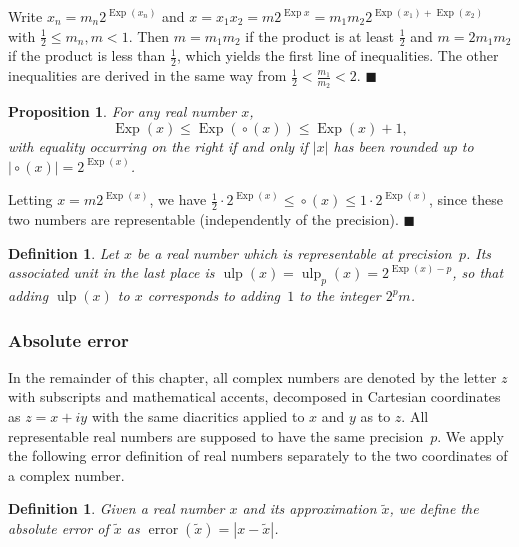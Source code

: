 \documentclass [12pt]{article}
\newcommand {\corr}[1]{{#1}}
\newcommand {\appro}[1]{\widetilde {#1}}
\newcommand {\Ulp}{{\operatorname {ulp}}}
\DeclareMathOperator{\Exp}{\operatorname {Exp}}
\newcommand{\error}{\operatorname {error}}
\newcommand {\round}{\operatorname {\circ}}
\renewcommand {\leq}{\leqslant}
\newtheorem{definition}[theorem]{Definition}
\newtheorem{prop}[theorem]{Proposition}
\newenvironment{proof}{\noindent{\bf Proof:}}{{\hspace* {\fill}$\blacksquare$}}
\begin{document}
\begin {proof}
Write $x_n = m_n 2^{\Exp (x_n)}$ and
$x = x_1 x_2 = m 2^{\Exp x} = m_1 m_2 2^{\Exp (x_1) + \Exp (x_2)}$
with $\frac {1}{2} \leq m_n, m < 1$.
Then $m = m_1 m_2$ if the product is at least $\frac {1}{2}$ and
$m = 2 m_1 m_2$ if the product is less than $\frac {1}{2}$, which
yields the first line of inequalities.
The other inequalities are derived in the same way from
$\frac {1}{2} < \frac {m_1}{m_2} < 2$.
\end {proof}


\begin {prop}
\label {prop:expround}
For any real number $x$,
\[
\Exp (x) \leq \Exp (\round (x)) \leq \Exp (x) + 1,
\]
with equality occurring on the right if and only if
$|x|$ has been rounded up to $|\round (x)| = 2^{\Exp (x)}$.
\end {prop}

\begin {proof}
Letting $x = m 2^{\Exp (x)}$, we have
$\frac {1}{2} \cdot 2^{\Exp (x)} \leq \round (x) \leq 1 \cdot 2^{\Exp (x)}$,
since these two numbers are representable (independently of the precision).
\end {proof}


\begin {definition}
\label {def:ulp}
Let $x$ be a real number which is representable at precision~$p$.
Its associated {\em unit in the last place} is
$\Ulp(x) = \Ulp_p (x) = 2^{\Exp(x) - p}$, so that adding $\Ulp(x)$ to $x$
corresponds to adding~$1$ to the integer $2^p m$.
\end {definition}


\subsubsection {Absolute error}

In the remainder of this chapter, all complex numbers are denoted by
the letter $z$ with subscripts and mathematical accents, decomposed in
Cartesian coordinates as $z = x + i y$ with the same diacritics applied
to $x$ and $y$ as to $z$. All representable real numbers are supposed
to have the same precision~$p$. We apply the following error definition
of real numbers separately to the two coordinates of a complex number.

\begin {definition}
\label {def:error}
Given a real number $\corr x$ and its approximation $\appro x$,
we define the {\em absolute error} of $\appro x$ as
$\error (\appro x) = | \corr x - \appro x |$.
\end {definition}
\end{document}
